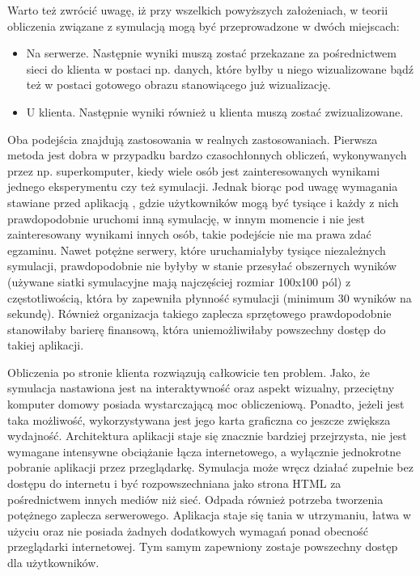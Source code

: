 Warto też zwrócić uwagę, iż przy wszelkich powyższych założeniach, w teorii
obliczenia związane z symulacją mogą być przeprowadzone w dwóch miejscach:

\begin{itemize} 

\item Na serwerze. Następnie wyniki muszą zostać przekazane za pośrednictwem
sieci do klienta w postaci np. danych, które byłby u niego wizualizowane bądź
też w postaci gotowego obrazu stanowiącego już wizualizację.

\item U klienta. Następnie wyniki również u klienta muszą zostać zwizualizowane.

\end{itemize}

Oba podejścia znajdują zastosowania w realnych zastosowaniach. Pierwsza metoda
jest dobra w przypadku bardzo czasochłonnych obliczeń, wykonywanych przez np.
superkomputer, kiedy wiele osób jest zainteresowanych wynikami jednego
eksperymentu czy też symulacji. Jednak biorąc pod uwagę wymagania stawiane przed
aplikacją \en, gdzie użytkowników mogą być tysiące i każdy z nich prawdopodobnie
uruchomi inną symulację, w innym momencie i nie jest zainteresowany wynikami
innych osób, takie podejście nie ma prawa zdać egzaminu. Nawet potężne serwery,
które uruchamiałyby tysiące niezależnych symulacji, prawdopodobnie nie byłyby w
stanie przesyłać obszernych wyników (używane siatki symulacyjne mają najczęściej
rozmiar 100x100 pól) z częstotliwością, która by zapewniła płynność symulacji
(minimum 30 wyników na sekundę). Również organizacja takiego zaplecza
sprzętowego prawdopodobnie stanowiłaby barierę finansową, która uniemożliwiłaby
powszechny dostęp do takiej aplikacji.

Obliczenia po stronie klienta rozwiązują całkowicie ten problem. Jako, że
symulacja nastawiona jest na interaktywność oraz aspekt wizualny, przeciętny
komputer domowy posiada wystarczającą moc obliczeniową. Ponadto, jeżeli jest
taka możliwość, wykorzystywana jest jego karta graficzna co jeszcze zwiększa
wydajność. Architektura aplikacji staje się znacznie bardziej przejrzysta, nie
jest wymagane intensywne obciążanie łącza internetowego, a wyłącznie jednokrotne
pobranie aplikacji przez przeglądarkę. Symulacja może wręcz działać zupełnie bez
dostępu do internetu i być rozpowszechniana jako strona HTML za pośrednictwem
innych mediów niż sieć. Odpada również potrzeba tworzenia potężnego zaplecza
serwerowego. Aplikacja staje się tania w utrzymaniu, łatwa w użyciu oraz nie
posiada żadnych dodatkowych wymagań ponad obecność przeglądarki internetowej.
Tym samym zapewniony zostaje powszechny dostęp dla użytkowników.


